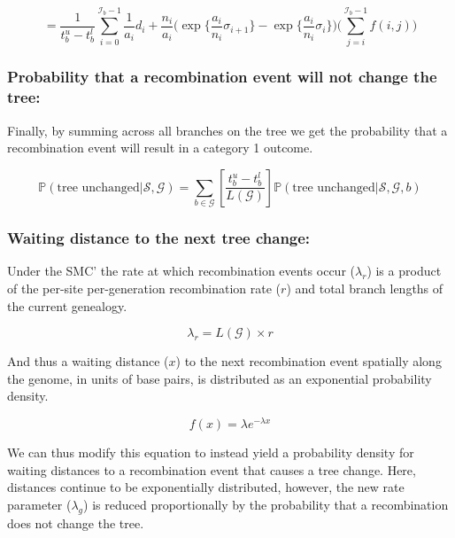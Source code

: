 \documentclass[11pt]{article}
\begin{document}
\begin{equation}
	= \frac{1}{t^u_b - t^l_b}
	\sum_{i=0}^{\mathcal{I}_b-1} \frac{1}{a_i} d_i + 
	\frac{n_i}{a_i} 
	\bigg(
		\exp\bigg\{\frac{a_i}{n_i}\sigma_{i+1}\bigg\} - 
		\exp\bigg\{\frac{a_i}{n_i}\sigma_i\bigg\}
	\bigg)
	\bigg(\sum_{j=i}^{\mathcal{I}_b-1}f(i,j)\bigg)
\end{equation}


\subsubsection{Probability that a recombination event will not change the tree:}
Finally, by summing across all branches on the tree 
we get the
probability that a recombination event will result in a category 1 outcome.

\begin{equation}
	\mathbb{P}(\textrm{tree unchanged} | \mathcal{S},\mathcal{G}) = 
	\sum_{b \in \mathcal{G}}
	\left[\frac{t^u_b - t^l_b}{L(\mathcal{G})}\right]
	\mathbb{P}(\textrm{tree unchanged} | \mathcal{S},\mathcal{G},b)
\end{equation}

\subsubsection{Waiting distance to the next tree change:}
Under the SMC' the rate at which recombination events occur ($\lambda_r$)
is a product of the per-site per-generation recombination rate ($r$) and 
total branch lengths of the current genealogy.

\begin{equation}
	\lambda_{r} = L(\mathcal{G}) \times r
\end{equation}

\noindent And thus a waiting distance ($x$) to the next recombination event 
spatially along the genome, in units of base pairs,
is distributed as an exponential probability density.

\begin{equation}
	f(x) = \lambda e^{-\lambda x}
\end{equation}

\noindent We can thus modify this equation to instead yield a probability
density for waiting distances to a recombination event that causes a 
tree change. 
Here, distances continue to be exponentially distributed, however, 
the new rate parameter ($\lambda_g$) is reduced proportionally by 
the probability that a recombination does not change the tree.
\end{document}
